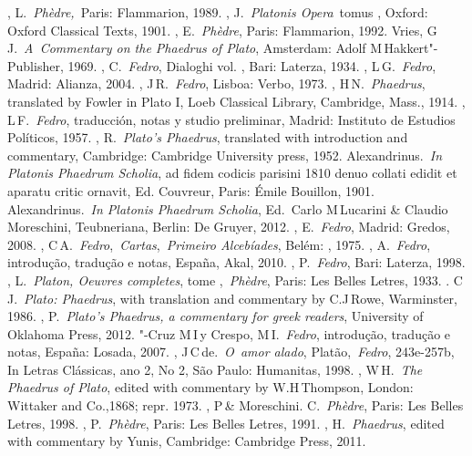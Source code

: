 \begin{bibliohedra}
, L.~\emph{Phèdre,~}Paris: Flammarion, 1989.
, J.~\emph{Platonis Opera}~tomus , Oxford: Oxford Classical
  Texts, 1901.
, E.~\emph{Phèdre}, Paris: Flammarion, 1992.
 Vries, G\,J.~\emph{A~Commentary on the Phaedrus of Plato},
  Amsterdam: Adolf M\,Hakkert"-Publisher, 1969.
, C.~\emph{Fedro}, Dialoghi vol. , Bari: Laterza, 1934.
, L\,G.~\emph{Fedro}, Madrid: Alianza, 2004.
, J\,R.~\emph{Fedro}, Lisboa: Verbo, 1973.
, H\,N.~\emph{Phaedrus}, translated by Fowler in Plato I, Loeb
  Classical Library, Cambridge, Mass., 1914.
, L\,F.~\emph{Fedro}, traducción, notas y studio preliminar,
  Madrid: Instituto de Estudios Políticos, 1957.
, R.~\emph{Plato's Phaedrus}, translated with introduction
  and commentary, Cambridge: Cambridge University press, 1952.
 Alexandrinus.~\emph{In Platonis Phaedrum Scholia}, ad fidem
  codicis parisini 1810 denuo collati edidit et aparatu critic ornavit,
  Ed. Couvreur, Paris: Émile Bouillon, 1901.
 Alexandrinus.~\emph{In Platonis Phaedrum Scholia}, Ed.~Carlo
  M\,Lucarini \& Claudio Moreschini, Teubneriana, Berlin: De Gruyer,
  2012.
, E.~\emph{Fedro}, Madrid: Gredos, 2008.
, C\,A.~\emph{Fedro},~\emph{Cartas},~\emph{Primeiro Alcebíades},
  Belém: , 1975.
, A.~\emph{Fedro}, introdução, tradução e notas, España, Akal,
  2010.
, P.~\emph{Fedro}, Bari: Laterza, 1998.
, L.~\emph{Platon, Oeuvres completes}, tome ,~\emph{Phèdre},
  Paris: Les Belles Letres, 1933.
. C\,J.~\emph{Plato: Phaedrus}, with translation and commentary by
  C.J\,Rowe, Warminster, 1986.
, P.~\emph{Plato's Phaedrus, a commentary for greek readers},
  University of Oklahoma Press, 2012.
"-Cruz M\,I\,y Crespo, M\,I.~\emph{Fedro}, introdução, tradução e
  notas, España: Losada, 2007.
, J\,C\,de.~\emph{O~amor alado}, Platão,~\emph{Fedro}, 243e-257b,
  In Letras Clássicas, ano 2, No 2, São Paulo: Humanitas, 1998.
, W\,H.~\emph{The Phaedrus of Plato}, edited with commentary
  by W.H\,Thompson, London: Wittaker and Co.,1868; repr. 1973.
, P\,\& Moreschini. C.~\emph{Phèdre}, Paris: Les Belles Letres,
  1998.
, P.~\emph{Phèdre}, Paris: Les Belles Letres, 1991.
, H.~\emph{Phaedrus}, edited with commentary by Yunis, Cambridge:
  Cambridge Press, 2011.
\end{bibliohedra}

